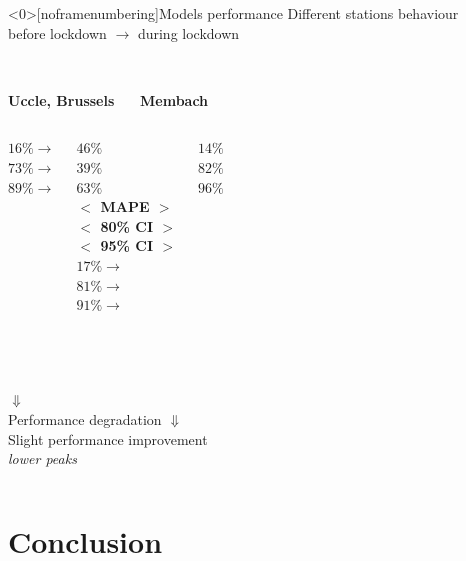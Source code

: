 \documentclass{beamer}
\begin{document}
\begin{frame}<0>[noframenumbering]{Models performance}
	\centering Different stations behaviour\\before lockdown $\rightarrow$ during lockdown\\~\\
	\begin{columns}[T]
		\centering
		\textbf{Uccle, Brussels}~~~
		\centering
		\centering
		\textbf{Membach}
	\end{columns}
	\begin{columns}[T]
		\raggedleft
		${16\%} \rightarrow$\\
		${73\%} \rightarrow$\\
		${89\%} \rightarrow$\\
		\raggedright
		$46\%$\\
		$39\%$\\
		$63\%$\\
		\centering
		\textbf{$<$ MAPE $>$}\\\textbf{$<$ 80\% CI $>$}\\\textbf{$<$ 95\% CI $>$}\\
		\raggedleft
		$17\% \rightarrow$\\
		$81\% \rightarrow$\\
		$91\% \rightarrow$\\
		\raggedright
		${14\%}$\\
		${82\%}$\\
		${96\%}$\\
	\end{columns}~\\
	\begin{columns}[T]
		\centering
		$\Downarrow$\\
		Performance degradation
		\centering
		$\Downarrow$\\
		Slight performance improvement\\
		\textit{lower peaks}
	\end{columns}
\end{frame}


\section{Conclusion}
\end{document}
